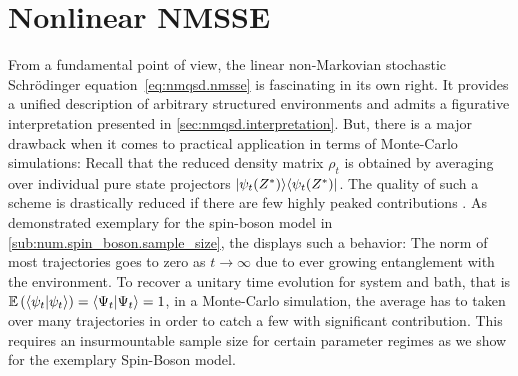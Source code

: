 \section{Nonlinear NMSSE}
\label{sec:nmqsd.nonlin_nmsse}
%

From a fundamental point of view, the linear non-Markovian stochastic Schrödinger equation~\ref{eq:nmqsd.nmsse} is fascinating in its own right.
It provides a unified description of arbitrary structured environments and admits a figurative interpretation presented in \autoref{sec:nmqsd.interpretation}.
But, there is a major drawback when it comes to practical application in terms of Monte-Carlo simulations:
Recall that the reduced density matrix $\rho_t$ is obtained by averaging over individual pure state projectors $\ket{\psitZ}\bra{\psitZ}$.
The quality of such a scheme is drastically reduced if there are few highly peaked contributions \cite{DuSh11_monte_carlo}.
As demonstrated exemplary for the spin-boson model in \autoref{sub:num.spin_boson.sample_size}, the \NMSSE displays such a behavior:
The norm of most trajectories goes to zero as $t \to \infty$ due to ever growing entanglement with the environment.
To recover a unitary time evolution for system and bath, that is $\E[\braket{\psi_t}{\psi_t}] = \braket{\Psi_t}{\Psi_t} = 1$, in a Monte-Carlo simulation, the average has to taken over many trajectories in order to catch a few with significant contribution.
This requires an insurmountable sample size for certain parameter regimes as we show for the exemplary Spin-Boson model.

